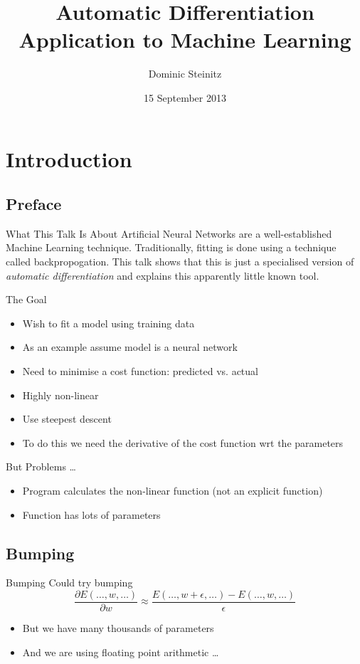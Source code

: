 \documentclass{beamer}
\title[Automatic differentiation and neural nets]{Automatic
  Differentiation\\Application to Machine Learning}
\author{Dominic Steinitz}
\institute{Kingston University}
\date{15 September 2013}
\begin{document}
\begin{frame}
\titlepage
\end{frame}

\section{Introduction}

\subsection{Preface}

\begin{frame}{What This Talk Is About}
Artificial Neural Networks are a well-established Machine Learning
technique. Traditionally, fitting is done using a technique called
backpropogation. This talk shows that this is just a specialised
version of {\em automatic differentiation} and explains this apparently
little known tool.
\end{frame}

\begin{frame}{The Goal}
\begin{itemize}
\item
Wish to fit a model using training data
\item
As an example assume model is a neural network
\item
Need to minimise a cost function: predicted vs. actual
\item
Highly non-linear
\item
Use steepest descent
\item
To do this we need the derivative of the cost function wrt the parameters
\end{itemize}
\end{frame}

\begin{frame}{But Problems \ldots}
\begin{itemize}
\item
Program calculates the non-linear function (not an explicit function)
\item
Function has lots of parameters
\end{itemize}
\end{frame}

\subsection{Bumping}

\begin{frame}{Bumping}
Could try bumping
$$
\frac{\partial E(\ldots, w, \ldots)}{\partial w} \approx \frac{E(\ldots, w + \epsilon, \ldots) - E(\ldots, w, \ldots)}{\epsilon}
$$
\begin{itemize}
\item
But we have many thousands of parameters
\item
And we are using floating point arithmetic \ldots
\end{itemize}
\end{frame}
\end{document}
